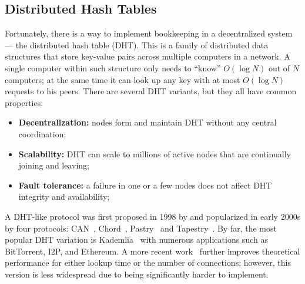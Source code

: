 \nocite{puigcerver2020scalable}

\vspace{-2px}

\subsection{Distributed Hash Tables}\label{sect:related_dht}

\vspace{-2px}

Fortunately, there is a way to implement bookkeeping in a decentralized system --- the distributed hash table (DHT). This is a family of distributed data structures that store key-value pairs across multiple computers in a network. A single computer within such structure only needs to ``know'' $O(\log N)$ out of $N$ computers; at the same time it can look up any key with at most $O(\log N)$ requests to his peers. There are several DHT variants, but they all have common properties:
\vspace{-4px}
\begin{itemize}[leftmargin=*]
    \item \textbf{Decentralization:} nodes form and maintain DHT without any central coordination;
    \item \textbf{Scalability:} DHT can scale to millions of active nodes that are continually joining and leaving; 
    \item \textbf{Fault tolerance:} a failure in one or a few nodes does not affect DHT integrity and availability;
\end{itemize} 

A DHT-like protocol was first proposed in 1998 by \cite{tewari1998beyond} and popularized in early 2000s by four protocols: CAN~\cite{can}, Chord~\cite{chord}, Pastry~\cite{pastry} and Tapestry~\cite{tapestry}. By far, the most popular DHT variation is Kademlia~\cite{kademlia} with numerous applications such as BitTorrent, I2P, and Ethereum. A more recent work~\cite{kaashoek2003koorde} further improves theoretical performance for either lookup time or the number of connections; however, this version is less widespread due to being significantly harder to implement.
